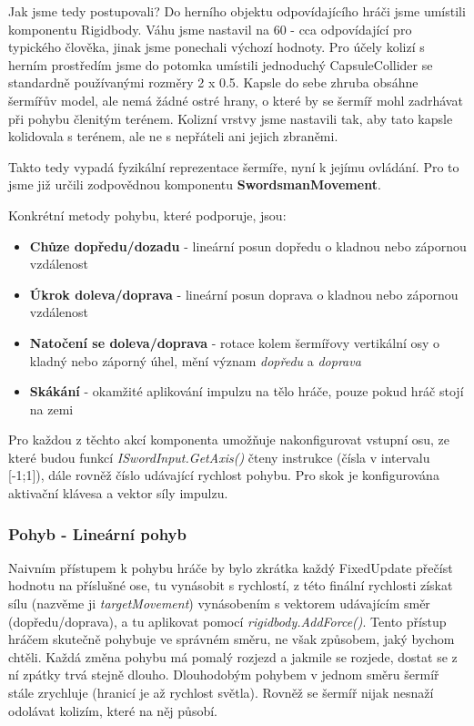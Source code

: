 Jak jsme tedy postupovali? Do herního objektu odpovídajícího hráči jsme umístili komponentu Rigidbody. Váhu jsme nastavil na 60 - cca odpovídající pro typického člověka, jinak jsme ponechali výchozí hodnoty. Pro účely kolizí s herním prostředím jsme do potomka umístili jednoduchý CapsuleCollider se standardně používanými rozměry 2 x 0.5. Kapsle do sebe zhruba obsáhne šermířův model, ale nemá žádné ostré hrany, o které by se šermíř mohl zadrhávat při pohybu členitým terénem. Kolizní vrstvy jsme nastavili tak, aby tato kapsle kolidovala s terénem, ale ne s nepřáteli ani jejich zbraněmi.

Takto tedy vypadá fyzikální reprezentace šermíře, nyní k jejímu ovládání. Pro to jsme již určili zodpovědnou komponentu \textbf{SwordsmanMovement}. 

Konkrétní metody pohybu, které podporuje, jsou:
\begin{itemize}
  \item \textbf{Chůze dopředu/dozadu} - lineární posun dopředu o kladnou nebo zápornou vzdálenost
  \item \textbf{Úkrok doleva/doprava} - lineární posun doprava o kladnou nebo zápornou vzdálenost
  \item \textbf{Natočení se doleva/doprava} - rotace kolem šermířovy vertikální osy o kladný nebo záporný úhel, mění význam \textit{dopředu} a \textit{doprava}
  \item \textbf{Skákání} - okamžité aplikování impulzu na tělo hráče, pouze pokud hráč stojí na zemi
\end{itemize}

Pro každou z těchto akcí komponenta umožňuje nakonfigurovat vstupní osu, ze které budou funkcí \textit{ISwordInput.GetAxis()} čteny instrukce (čísla v intervalu [-1;1]), dále rovněž číslo udávající rychlost pohybu. Pro skok je konfigurována aktivační klávesa a vektor síly impulzu.

\subsubsection*{Pohyb - Lineární pohyb}

Naivním přístupem k pohybu hráče by bylo zkrátka každý FixedUpdate přečíst hodnotu na příslušné ose, tu vynásobit s rychlostí, z této finální rychlosti získat sílu (nazvěme ji \textit{targetMovement}) vynásobením s vektorem udávajícím směr (dopředu/doprava), a tu aplikovat pomocí \textit{rigidbody.AddForce()}.
Tento přístup hráčem skutečně pohybuje ve správném směru, ne však způsobem, jaký bychom chtěli. Každá změna pohybu má pomalý rozjezd a jakmile se rozjede, dostat se z ní zpátky trvá stejně dlouho. Dlouhodobým pohybem v jednom směru šermíř stále zrychluje (hranicí je až rychlost světla). Rovněž se šermíř nijak nesnaží odolávat kolizím, které na něj působí. 

